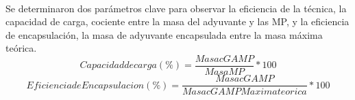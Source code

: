 \documentclass[a4paper,11pt]{article}
\begin{document}
\\Se determinaron dos parámetros clave para observar la eficiencia de la técnica, la capacidad de carga, cociente entre la masa del adyuvante y las MP, y la eficiencia de encapsulación, la masa de adyuvante encapsulada entre la masa máxima teórica.
\begin{displaymath}
	Capacidad de carga(\%) =  \frac{Masa cGAMP}{Masa MP} * 100
\end{displaymath}
\begin{displaymath}
	Eficiencia de Encapsulacion (\%) = \frac{Masa cGAMP}{Masa cGAMP Maxima  teorica} * 100
\end{displaymath}




	
\end{document}
